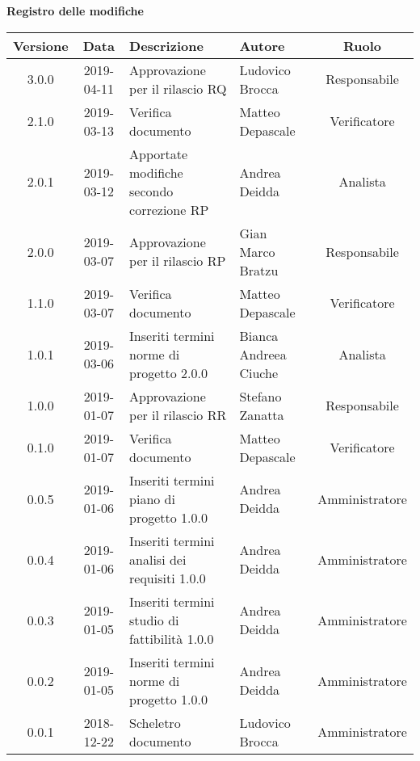 \begin{center}
	\textbf{Registro delle modifiche}
	\end{center}
	\begin{center}
		\begin{tabularx}{\textwidth}{|c|c|X|X|c|}
			\hline
			\textbf{Versione} & \textbf{Data} & \textbf{Descrizione} & \textbf{Autore} & \textbf{Ruolo} \\
			\hline
			3.0.0 & 2019-04-11 & Approvazione per il rilascio RQ & Ludovico Brocca & Responsabile \\
			\hline
			2.1.0 & 2019-03-13 & Verifica documento & Matteo Depascale & Verificatore \\
			\hline
			2.0.1 & 2019-03-12 & Apportate modifiche secondo correzione RP & Andrea Deidda & Analista \\
			\hline
			2.0.0 & 2019-03-07 & Approvazione per il rilascio RP & Gian Marco Bratzu & Responsabile \\
			\hline
			1.1.0 & 2019-03-07 & Verifica documento & Matteo Depascale & Verificatore \\
			\hline
			1.0.1 & 2019-03-06 & Inseriti termini norme di progetto 2.0.0 & Bianca Andreea Ciuche & Analista \\
			\hline
			1.0.0 & 2019-01-07 & Approvazione per il rilascio RR & Stefano Zanatta & Responsabile \\
			\hline
			0.1.0 & 2019-01-07 & Verifica documento & Matteo Depascale & Verificatore \\
			\hline
			0.0.5 & 2019-01-06 & Inseriti termini piano di progetto 1.0.0 & Andrea Deidda & Amministratore\\
			\hline
			0.0.4 & 2019-01-06 & Inseriti termini analisi dei requisiti 1.0.0 & Andrea Deidda & Amministratore\\
			\hline
			0.0.3 & 2019-01-05 & Inseriti termini studio di fattibilità 1.0.0 & Andrea Deidda & Amministratore\\
			\hline
			0.0.2 & 2019-01-05 & Inseriti termini norme di progetto 1.0.0 & Andrea Deidda & Amministratore\\
			\hline
			0.0.1 & 2018-12-22 & Scheletro documento & Ludovico Brocca & Amministratore\\
			\hline
		\end{tabularx}
	\end{center}
\newpage